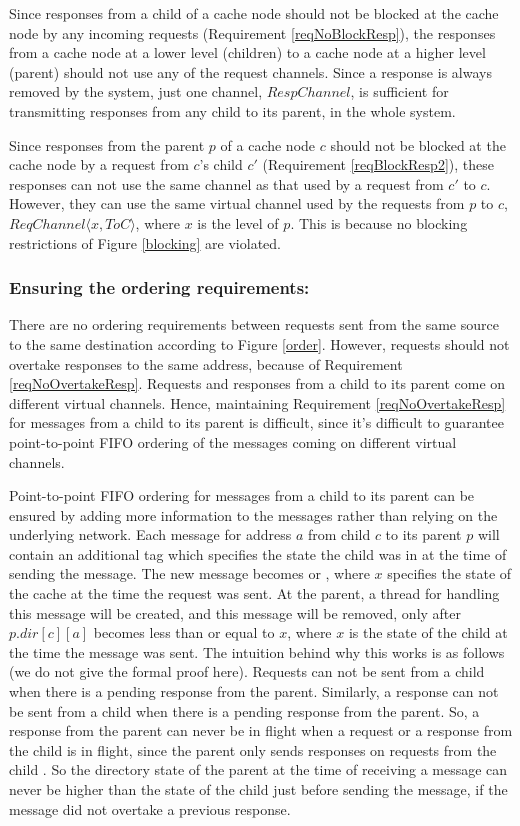 Since responses from a child of a cache node should not be blocked at the cache
node by any incoming requests (Requirement \ref{reqNoBlockResp}), the responses
from a cache node at a lower level (children) to a cache node at a higher level
(parent) should not use any of the request channels. Since a
response is always removed by the system, just one channel, $RespChannel$, is
sufficient for transmitting responses from any child to its parent, in the
whole system.

Since responses from the parent $p$ of a cache node $c$ should not be blocked
at the cache node by a request from $c$'s child $c'$ (Requirement
\ref{reqBlockResp2}), these responses can not use the same channel as that used
by a request from $c'$ to $c$. However, they can use the same virtual channel
used by the requests from $p$ to $c$, $ReqChannel\langle x, ToC \rangle$, where
$x$ is the level of $p$. This is because no blocking restrictions of Figure
\ref{blocking} are violated.

\subsubsection{Ensuring the ordering requirements:}
There are no ordering requirements between requests sent from the same source
to the same destination according to Figure \ref{order}.  However, requests
should not overtake responses to the same address, because of Requirement
\ref{reqNoOvertakeResp}. Requests and responses from a child to its parent come
on different virtual channels. Hence, maintaining Requirement
\ref{reqNoOvertakeResp} for messages from a child to its parent is difficult,
since it's difficult to guarantee point-to-point FIFO ordering of the messages
coming on different virtual channels.

Point-to-point FIFO ordering for messages from a child to its parent can be
ensured by adding more information to the messages rather than relying on the
underlying network. Each message for address $a$ from child $c$ to its parent
$p$ will contain an additional tag which specifies the state the child was in
at the time of sending the message. The new message becomes  or , where $x$ specifies the
state of the cache at the time the request was sent. At the parent, a thread
for handling this message will be created, and this message will be removed,
only after $p.dir[c][a]$ becomes less than or equal to $x$, where $x$ is the
state of the child at the time the message was sent. The intuition behind why
this works is as follows (we do not give the formal proof here). Requests can
not be sent from a child when there is a pending response from the parent. Similarly, a response can not be sent from
a child when there is a pending response from the parent. So, a response from the parent can never be in flight
when a request or a response from the child is in flight, since the
parent only sends responses on requests from the child . So the directory state of the parent at the time of
receiving a message can never be higher than the state of the child just before
sending the message, if the message did not overtake a previous response.

